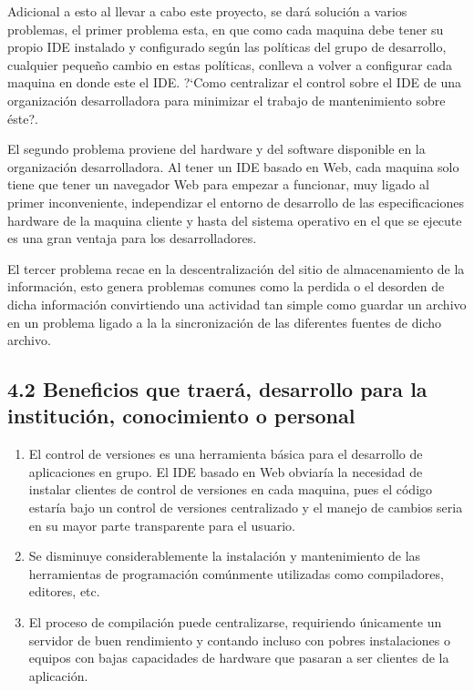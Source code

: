 \documentclass[12pt,letterpaper,oneside]{article}
\begin{document}
\bigskip

Adicional a esto al llevar a cabo este proyecto, se dará solución a
varios problemas, el primer problema esta, en que como cada maquina
debe tener su propio IDE instalado y configurado según las
políticas del grupo de desarrollo, cualquier pequeño cambio en
estas políticas, conlleva a volver a configurar cada maquina en donde
este el IDE. ?`Como centralizar el control sobre el IDE de una
organización desarrolladora para minimizar el trabajo de
mantenimiento sobre éste?.

\bigskip

El segundo problema proviene del hardware y del software disponible en
la organización desarrolladora. Al tener un IDE basado en Web, cada
maquina solo tiene que tener un navegador Web para empezar a funcionar,
muy ligado al primer inconveniente, independizar el entorno de
desarrollo de las especificaciones hardware de la maquina cliente y
hasta del sistema operativo en el que se ejecute es una gran ventaja
para los desarrolladores.


\bigskip

El tercer problema recae en la descentralización del sitio de
almacenamiento de la información, esto genera problemas comunes como
la perdida o el desorden de dicha información convirtiendo una
actividad tan simple como guardar un archivo en un problema ligado a la
la sincronización de las diferentes fuentes de dicho archivo.


\bigskip

\subsection{4.2 Beneficios que traerá, desarrollo para la
institución, conocimiento o personal}

\bigskip


\begin{enumerate}
\item El control de versiones es una herramienta básica para el
desarrollo de aplicaciones en grupo. El IDE basado en Web obviaría la
necesidad de instalar clientes de control de versiones en cada maquina,
pues el código estaría bajo un control de versiones centralizado y
el manejo de cambios seria en su mayor parte transparente para el
usuario.


\bigskip
\item Se disminuye considerablemente la instalación y mantenimiento de
las herramientas de programación comúnmente utilizadas como
compiladores, editores, etc.


\bigskip
\item El proceso de compilación puede centralizarse, requiriendo
únicamente un servidor de buen rendimiento y contando incluso con
pobres instalaciones o equipos con bajas capacidades de hardware que
pasaran a ser clientes de la aplicación.
\end{enumerate}
\end{document}

